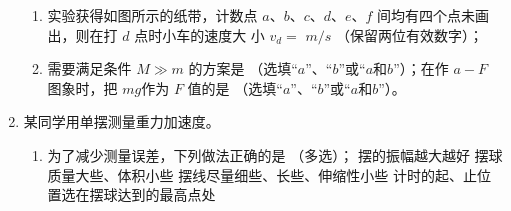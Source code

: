 \begin{enumerate}
\begin{enumerate}
\end{enumerate}

\begin{enumerate}
\item
实验获得如图所示的纸带，计数点 $ a $、$ b $、$ c $、$ d $、$ e $、$ f $ 间均有四个点未画出，则在打 $ d $ 点时小车的速度大
小 $ v_d=$ \underlinegap $ m/s $ （保留两位有效数字）；
\begin{figure}[h!]
\centering

\end{figure}

\item 
需要满足条件 $ M \gg m $ 的方案是 \underlinegap （选填“$ a $”、“$ b $”或“$ a $和$ b $”）；在作 $ a-F $ 图象时，把 $ mg $作为 $ F $ 值的是 \underlinegap （选填“$ a $”、“$ b $”或“$ a $和$ b $”）。



\end{enumerate}





\item
某同学用单摆测量重力加速度。
\begin{enumerate}
\item
为了减少测量误差，下列做法正确的是 \underlinegap （多选）；
\fourchoices
{摆的振幅越大越好}
{摆球质量大些、体积小些}
{摆线尽量细些、长些、伸缩性小些}
{计时的起、止位置选在摆球达到的最高点处}


\end{enumerate}
\end{enumerate}
